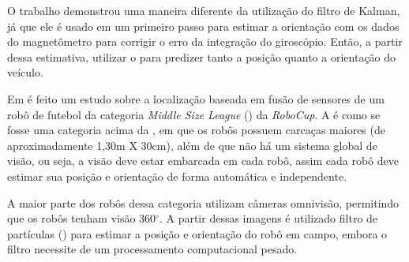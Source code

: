 \documentclass[acronym, symbols, table]{fei}
\begin{document}
O trabalho demonstrou uma maneira diferente da utilização do filtro de Kalman, já que ele é usado em um primeiro passo para estimar a orientação com os dados do magnetômetro para corrigir o erro da integração do giroscópio. Então, a partir dessa estimativa, utilizar o  para predizer tanto a posição quanto a orientação do veículo.

%	

Em \textcite{ismail2022soccer} é feito um estudo sobre a localização baseada em fusão de sensores de um robô de futebol da categoria \textit{Middle Size League} () da \textit{RoboCup}. A  é como se fosse uma categoria acima da , em que os robôs possuem carcaças maiores (de aproximadamente 1,30m X 30cm), além de que não há um sistema global de visão, ou seja, a visão deve estar embarcada em cada robô, assim cada robô deve estimar sua posição e orientação de forma automática e independente.

A maior parte dos robôs dessa categoria utilizam câmeras omnivisão, permitindo que os robôs tenham visão 360$^\circ$. A partir dessas imagens é utilizado filtro de partículas () para estimar a posição e orientação do robô em campo, embora o filtro necessite de um processamento computacional pesado.
\end{document}

